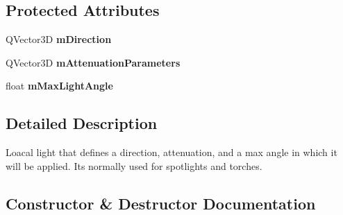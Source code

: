 \subsection*{Protected Attributes}
\begin{DoxyCompactItemize}
\item 
\mbox{\label{class_geometry_engine_1_1_geometry_world_item_1_1_geometry_light_1_1_spotlight_add161138d99c9f92491bd19ee69f3301}} 
Q\+Vector3D {\bfseries m\+Direction}
\item 
\mbox{\label{class_geometry_engine_1_1_geometry_world_item_1_1_geometry_light_1_1_spotlight_aade2774067f1bc0c8c751571a8a700e1}} 
Q\+Vector3D {\bfseries m\+Attenuation\+Parameters}
\item 
\mbox{\label{class_geometry_engine_1_1_geometry_world_item_1_1_geometry_light_1_1_spotlight_a57abdc5f5abf4a1537355b85c4c00a80}} 
float {\bfseries m\+Max\+Light\+Angle}
\end{DoxyCompactItemize}


\subsection{Detailed Description}
Loacal light that defines a direction, attenuation, and a max angle in which it will be applied. It\textquotesingle{}s normally used for spotlights and torches. 

\subsection{Constructor \& Destructor Documentation}
\mbox{\label{class_geometry_engine_1_1_geometry_world_item_1_1_geometry_light_1_1_spotlight_a421172550334c85b4a8c5b129578ea22}} 
